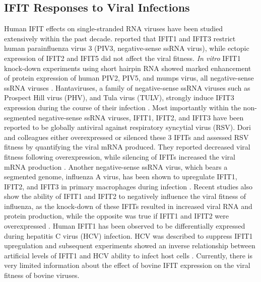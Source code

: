 \subsection{IFIT Responses to Viral Infections} \label{subsec:IFIT Responses to Viral Infections}
Human IFIT effects on single-stranded RNA viruses have been studied extensively within the past decade. \cite{Rabbani2016Identification3} reported that IFIT1 and IFIT3 restrict human parainfluenza virus 3 (PIV3, negative-sense ssRNA virus), while ectopic expression of IFIT2 and IFIT5 did not affect the viral fitness. \textit{In vitro} IFIT1 knock-down experiments using short hairpin RNA showed marked enhancement of protein expression of human PIV2, PIV5, and mumps virus, all negative-sense ssRNA viruses \cite{Andrejeva2013ISG56/IFIT1Synthesis, Young2016HumanFamily}. Hantaviruses, a family of negative-sense ssRNA viruses such as Prospect Hill virus (PHV), and Tula virus (TULV), strongly induce IFIT3 expression during the course of their infection \cite{Matthys2011TheInduction}. Most importantly within the non-segmented negative-sense ssRNA viruses, IFIT1, IFIT2, and IFIT3 have been reported to be globally antiviral against respiratory syncytial virus (RSV). Dori and colleagues either overexpressed or silenced these 3 IFITs and assessed RSV fitness by quantifying the viral mRNA produced. They reported decreased viral fitness following overexpression, while silencing of IFITs increased the viral mRNA production \cite{Drori2020InfluenzaProteins}. Another negative-sense ssRNA virus, which bears a segmented genome, influenza A virus, has been shown to upregulate IFIT1, IFIT2, and IFIT3 in primary macrophages during infection \cite{Lietzen2011QuantitativeMacrophages}. Recent studies also show the ability of IFIT1 and IFIT2 to negatively influence the viral fitness of influenza, as the knock-down of these IFITs resulted in increased viral RNA and protein production, while the opposite was true if IFIT1 and IFIT2 were overexpressed \cite{Zhu2023TheSynthesis}. Human IFIT1 has been observed to be differentially expressed during hepatitis C virus (HCV) infection. HCV was described to suppress IFIT1 upregulation and subsequent experiments showed an inverse relationship between artificial levels of IFIT1 and HCV ability to infect host cells \cite{Raychoudhuri2011ISG56Replication, Ishida2019HepaticInfection}. Currently, there is very limited information about the effect of bovine IFIT expression on the viral fitness of bovine viruses.


